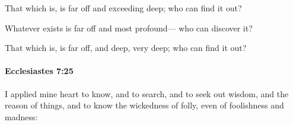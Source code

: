 			\begin{versebox}
					\item[BHS] 
					\item[LXX] 
					\item[ASV] That which is, is far off and exceeding deep; who can find it out?
					\item[NIV] Whatever exists is far off and most profound— who can discover it?
					\item[NRSV] That which is, is far off, and deep, very deep; who can find it out?
			\end{versebox}

		\paragraph{Ecclesiastes 7:25} %
			\label{ECCLESIASTES-7-25}

			I applied mine heart to know, and to search, and to seek out wisdom, and the reason of things, and to know the wickedness of folly, even of foolishness and madness:

